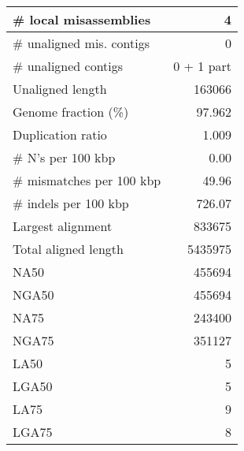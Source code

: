 \documentclass[12pt,a4paper]{article}
\begin{document}
\begin{table}[ht]
\begin{center}
\begin{tabular}{|l*{1}{|r}|}
\# local misassemblies & 4 \\ \hline
\# unaligned mis. contigs & 0 \\ \hline
\# unaligned contigs & 0 + 1 part \\ \hline
Unaligned length & 163066 \\ \hline
Genome fraction (\%) & 97.962 \\ \hline
Duplication ratio & 1.009 \\ \hline
\# N's per 100 kbp & 0.00 \\ \hline
\# mismatches per 100 kbp & 49.96 \\ \hline
\# indels per 100 kbp & 726.07 \\ \hline
Largest alignment & 833675 \\ \hline
Total aligned length & 5435975 \\ \hline
NA50 & 455694 \\ \hline
NGA50 & 455694 \\ \hline
NA75 & 243400 \\ \hline
NGA75 & 351127 \\ \hline
LA50 & 5 \\ \hline
LGA50 & 5 \\ \hline
LA75 & 9 \\ \hline
LGA75 & 8 \\ \hline
\end{tabular}
\end{center}
\end{table}
\end{document}
